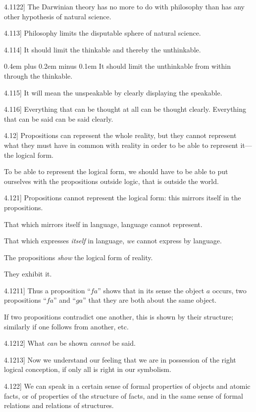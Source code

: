 \documentclass[12pt,oneside]{book}[2007/10/19]
\newcommand{\PropositionE}[2]{%
  \item[\phantomsection\label{PropE:#1}\PropGRef{#1}] #2%
}
\newcommand{\PropGRef}[1]{\hyperref[PropG:#1]{#1}}
\newcommand{\stretchyspace}{\spaceskip0.4em plus 0.2em minus 0.1em}
\begin{document}
\begin{propositions}
\PropositionE{4.1122}
{The Darwinian theory has no more to do with
philosophy than has any other hypothesis of natural
science.}


\PropositionE{4.113}
{Philosophy limits the disputable sphere of natural
science.}


\PropositionE{4.114}
{It should limit the thinkable and thereby the
unthinkable.

{\stretchyspace
It should limit the unthinkable from within
through the thinkable.}}


\PropositionE{4.115}
{It will mean the unspeakable by clearly displaying
the speakable.}


\PropositionE{4.116}
{Everything that can be thought at all can be
thought clearly. Everything that can be said can
be said clearly.}


\PropositionE{4.12}
{Propositions can represent the whole reality,
but they cannot represent what they must have in
common with reality in order to be able to represent
it---the logical form.

To be able to represent the logical form, we
should have to be able to put ourselves with the
propositions outside logic, that is outside the
world.}


\PropositionE{4.121}
{Propositions cannot represent the logical form:
this mirrors itself in the propositions.

That which mirrors itself in language, language
cannot represent.

That which expresses \emph{itself} in language, \emph{we}
cannot express by language.

The propositions \emph{show} the logical form of reality.

They exhibit it.}


\PropositionE{4.1211}
{Thus a proposition ``$fa$'' shows that in its sense
the object $a$ occurs, two propositions ``$fa$'' and
``$ga$'' that they are both about the same object.

If two propositions contradict one another, this
is shown by their structure; similarly if one follows
from another, etc.}


\PropositionE{4.1212}
{What \emph{can} be shown \emph{cannot} be said.}


\PropositionE{4.1213}
{Now we understand our feeling that we are in
possession of the right logical conception, if only
all is right in our symbolism.}


\PropositionE{4.122}
{We can speak in a certain sense of formal
properties of objects and atomic facts, or of properties
of the structure of facts, and in the same
sense of formal relations and relations of
structures.

}
\end{propositions}
\end{document}
